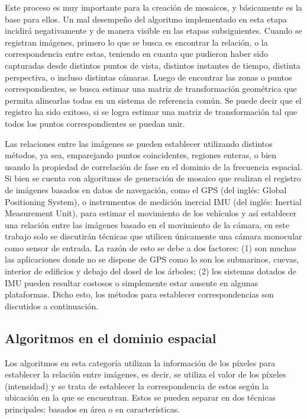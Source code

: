 Este proceso es muy importante para la creación de mosaicos, y básicamente es la base para ellos. Un mal desempeño del algoritmo implementado en esta etapa incidirá negativamente y de manera visible en las etapas subsiguientes. Cuando se registran imágenes, primero lo que se busca es encontrar la relación, o la correspondencia entre estas, teniendo en cuanta que pudieron haber sido capturadas desde distintos puntos de vista, distintos instantes de tiempo, distinta perspectiva, o incluso distintas cámaras. Luego de encontrar las zonas o puntos correspondientes, se busca estimar una matriz de transformación geométrica que permita alinearlas todas en un sistema de referencia común. Se puede decir que el registro ha sido exitoso, si se logra estimar una matriz de transformación tal que todos los puntos correspondientes se puedan unir.

Las relaciones entre las imágenes se pueden establecer utilizando distintos métodos, ya sea, emparejando puntos coincidentes, regiones enteras, o bien usando la propiedad de correlación de fase en el dominio de la frecuencia espacial. Si bien se cuenta con algoritmos de generación de mosaico que realizan el registro de imágenes basados en datos de navegación, como el GPS (del inglés: Global Positioning System), o instrumentos de medición inercial IMU (del inglés: Inertial Measurement Unit), para estimar el movimiento de los vehículos y así establecer una relación entre las imágenes basado en el movimiento de la cámara, en este trabajo solo se discutirán técnicas que utilicen únicamente una cámara monocular como sensor de entrada. La razón de esto se debe a dos factores: (1) son muchas las aplicaciones donde no se dispone de GPS como lo son los submarinos, cuevas, interior de edificios y debajo del dosel de los árboles; (2) los sistemas dotados de IMU pueden resultar costosos o simplemente estar ausente en algunas plataformas. Dicho esto, los métodos para establecer correspondencias son discutidos a continuación.

\subsection*{Algoritmos en el dominio espacial}

Los algoritmos en esta categoría utilizan la información de los píxeles para establecer la relación entre imágenes, es decir, se utiliza el valor de los píxeles (intensidad) y se trata de establecer la correspondencia de estos según la ubicación en la que se encuentran. Estos se pueden separar en dos técnicas principales: basados en área o en características.


